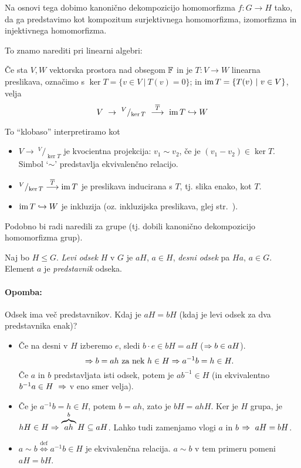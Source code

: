 \ni Na osnovi tega dobimo kanoni\v cno dekompozicijo homomorfizma $f : G \to H$ tako, da ga predstavimo kot kompozitum surjektivnega homomorfizma, izomorfizma
in injektivnega homomorfizma.

\ni To znamo narediti pri linearni algebri:
\begin{trditev}
	\v Ce sta $V, W$ vektorska prostora nad obsegom $\mathbb{F}$ in je $T : V\to W$ linearna preslikava, ozna\v cimo s $\ker T = \{v \in V\ |\ T(v) = 0\}$; in
	$\operatorname{im} T = \{T(v)\ |\ v\in V\}$, velja
	\[
		V\ \to\ ^V/_{\ker T}\ \stackrel{\overline{T}}{\longrightarrow}\ \im T \hookrightarrow W
	\]
\end{trditev}

To "`klobaso"' interpretiramo kot
\begin{itemize}
	\item{$V \to\ ^V/_{\ker T}$ je kvocientna projekcija: $v_1 \sim v_2$, \v ce je $(v_1 - v_2) \in \ker T$. Simbol `$\sim$' predstavlja ekvivalen\v cno relacijo.}
	\item{$^V/_{\ker T} \stackrel{\overline{T}}{\longrightarrow} \operatorname{im} T$ je preslikava inducirana s $T$, tj. slika enako, kot $T$.}
	\item{$\operatorname{im} T \hookrightarrow W$ je inkluzija (oz. inkluzijska preslikava, glej str.~\pageref{inkluzija}).}
\end{itemize}

Podobno bi radi naredili za grupe (tj. dobili kanoni\v cno dekompozicijo homomorfizma grup).

\pagebreak
\begin{defin}
	Naj bo $H \leq G$. \emph{Levi odsek} $H$ v $G$ je $aH$, $a \in H$, \emph{desni odsek} pa $Ha$, $a \in G$. Element $a$ je \emph{predstavnik} odseka.
\end{defin}

\paragraph{Opomba:} Odsek ima ve\v c predstavnikov. Kdaj je $aH = bH$ (kdaj je levi odsek za dva predstavnika enak)?
\begin{itemize}
	\item{\v Ce na desni v $H$ izberemo $e$, sledi $b\cdot e \in bH = aH$ ($\Rightarrow b \in aH$).
		\[
			\Rightarrow b = ah\ \text{za nek}\ h \in H \Rightarrow a^{-1}b = h \in H.
		\]
		\v Ce $a$ in $b$ predstavljata isti odsek, potem je $ab^{-1} \in H$ (in ekvivalentno $b^{-1}a \in H\ \Rightarrow$ v eno smer velja).}
	\item{\v Ce je $a^{-1}b = h \in H$, potem $b = ah$, zato je $bH = ahH$. Ker je $H$ grupa, je $hH \in H \Rightarrow \overbrace{ah}^b H \subseteq aH$. Lahko tudi
		zamenjamo vlogi $a$ in $b$ $\Rightarrow\ aH = bH$.}
	\item{$a \sim b \stackrel{\text{def}}{\iff} a^{-1}b \in H$ je ekvivalen\v cna relacija. $a \sim b$ v tem primeru pomeni $aH = bH$.}
\end{itemize}

